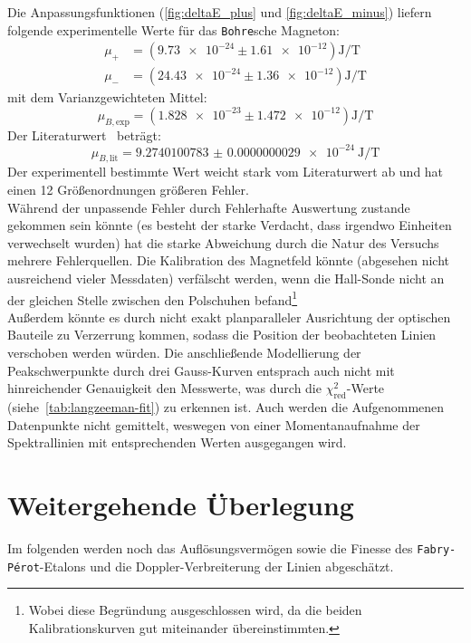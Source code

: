 \noindent Die Anpassungsfunktionen (\cref{fig:deltaE_plus} und \cref{fig:deltaE_minus}) liefern folgende experimentelle Werte für das \texttt{Bohre}sche Magneton:
\begin{align}
    \mu_+ &= (\num{9.73e-24}\pm\num{1.61e-12}) \si{\joule\per\tesla} \\
    \mu_- &= (\num{24.43e-24}\pm\num{1.36e-12}) \si{\joule\per\tesla}
\end{align}
mit dem Varianzgewichteten Mittel:
\begin{equation*}
    \mu_{B,\text{exp}} = (\num{1.828e-23}\pm\num{1.472e-12})\si{\joule\per\tesla} 
\end{equation*}
Der Literaturwert~\cite{NIST} beträgt:
\begin{equation*}
    \mu_{B,\text{lit}} = \SI{9.2740100783(29)e-24}{\joule\per\tesla}
\end{equation*}
Der experimentell bestimmte Wert weicht stark vom Literaturwert ab und hat einen 12 Größenordnungen größeren Fehler.\\
Während der unpassende Fehler durch Fehlerhafte Auswertung zustande gekommen sein könnte (es besteht der starke Verdacht, dass irgendwo Einheiten verwechselt wurden) hat die starke Abweichung durch die Natur des Versuchs mehrere Fehlerquellen.
\vspace{0.2cm}
Die Kalibration des Magnetfeld könnte (abgesehen nicht ausreichend vieler Messdaten) verfälscht werden, wenn die Hall-Sonde nicht an der gleichen Stelle zwischen den Polschuhen befand\footnote{Wobei diese Begründung ausgeschlossen wird, da die beiden Kalibrationskurven gut miteinander übereinstimmten.}\\
Außerdem könnte es durch nicht exakt planparalleler Ausrichtung der optischen Bauteile zu Verzerrung kommen, sodass die Position der beobachteten Linien verschoben werden würden.
\vspace{0.2cm}
Die anschließende Modellierung der Peakschwerpunkte durch drei Gauss-Kurven entsprach auch nicht mit hinreichender Genauigkeit den Messwerte, was durch die $\chi_{\text{red}}^2$-Werte (siehe~\cref{tab:langzeeman-fit}) zu erkennen ist. Auch werden die Aufgenommenen Datenpunkte nicht gemittelt, weswegen von einer Momentanaufnahme der Spektrallinien mit entsprechenden Werten ausgegangen wird.
%
%
\section{Weitergehende Überlegung}
Im folgenden werden noch das Auflösungsvermögen sowie die Finesse des \texttt{Fabry-Pérot}-Etalons und die Doppler-Verbreiterung der Linien abgeschätzt.
